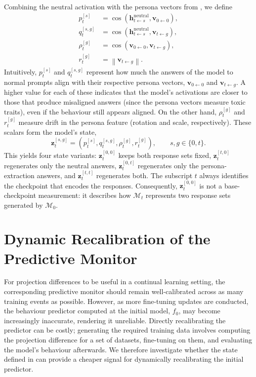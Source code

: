 Combining the neutral activation with the persona vectors from , we define
\begin{align}
p_t^{[s]}
&=
\cos\!\left(
\mathbf{h}^{\text{neutral}}_{t\leftarrow s},
\mathbf{v}_{0\leftarrow0}
\right),\\
q_t^{[s,g]}
&=
\cos\!\left(
\mathbf{h}^{\text{neutral}}_{t\leftarrow s},
\mathbf{v}_{t\leftarrow g}
\right),\\
\rho_t^{[g]}
&=
\cos\!\left(
\mathbf{v}_{0\leftarrow0},
\mathbf{v}_{t\leftarrow g}
\right),\\
r_t^{[g]}
&=
\left\lVert\mathbf{v}_{t\leftarrow g}\right\rVert.
\label{eq:state-components}
\end{align}
Intuitively, $p_t^{[s]}$ and $q_t^{[s,g]}$ represent how much the answers of the model to normal prompts align with their respective persona vectors, $\mathbf{v}_{0\leftarrow0}$ and $\mathbf{v}_{t\leftarrow g}$. A higher value for each of these indicates that the model's activations are closer to those that produce misaligned answers (since the persona vectors measure toxic traits), even if the behaviour still appears aligned. On the other hand, $\rho_t^{[g]}$ and $r_t^{[g]}$ measure drift in the persona feature (rotation and scale, respectively). These scalars form the model's state,
\begin{equation}
\mathbf{z}_t^{[s,g]}
=
\left(
p_t^{[s]},q_t^{[s,g]},\rho_t^{[g]},r_t^{[g]}
\right),
\qquad s,g\in\{0,t\}.
\label{eq:checkpoint-state}
\end{equation}
This yields four state variants: $\mathbf{z}_t^{[0,0]}$ keeps both response sets fixed, $\mathbf{z}_t^{[t,0]}$ regenerates only the neutral answers, $\mathbf{z}_t^{[0,t]}$ regenerates only the persona-extraction answers, and $\mathbf{z}_t^{[t,t]}$ regenerates both. The subscript $t$ always identifies the checkpoint that encodes the responses. Consequently, $\mathbf{z}_t^{[0,0]}$ is not a base-checkpoint measurement: it describes how $\mathcal{M}_t$ represents two response sets generated by $\mathcal{M}_0$. 

\section{Dynamic Recalibration of the Predictive Monitor}
\label{sec:dynamic-recalibration}

For projection differences to be useful in a continual learning setting, the corresponding predictive monitor should remain well-calibrated across as many training events as possible. However, as more fine-tuning updates are conducted, the behaviour predictor computed at the initial model, $f_0$, may become increasingly inaccurate, rendering it unreliable. Directly recalibrating the predictor can be costly; generating the required training data involves computing the projection difference for a set of datasets, fine-tuning on them, and evaluating the model's behaviour afterwards. We therefore investigate whether the state defined in  can provide a cheaper signal for dynamically recalibrating the initial predictor.

